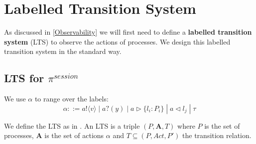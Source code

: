 

\section{Labelled Transition System}
As discussed in \autoref{Observability} we will first need to define a \textbf{labelled transition system} (LTS) to observe the actions of processes. We design this labelled transition system in the standard way. 
\subsection{LTS for $\pi^{session}$}

We use $\alpha$ to range over the labels:
\begin{equation*}
    \alpha ::= a!\langle v \rangle \; | \; a?(y) \; | \; a \vartriangleright \{ l_i : P_i \} \; | \; a \vartriangleleft  l_j \; | \; \tau
\end{equation*}

We define the LTS as in \citep{coinductionSangiorgi}.
An LTS is a triple $(P, \mathbf{A}, T)$ where $P$ is the set of processes, $\mathbf{A}$ is the set of actions $\alpha$ and $T \subseteq (P, Act, P')$ the transition relation.

